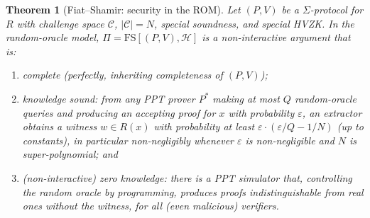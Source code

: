 \documentclass[11pt,a4paper]{article}
\newtheorem{theorem}{Theorem}[section]
\theoremstyle{definition}
\theoremstyle{remark}
\begin{document}
\begin{theorem}[Fiat--Shamir: security in the ROM]\label{zk:thm:fs}
Let \((P,V)\) be a \(\Sigma\)-protocol for \(R\) with challenge space \(\mathcal{C}\), \(|\mathcal{C}| = N\), special soundness, and special HVZK. In the random-oracle model, \(\Pi = \mathrm{FS}[(P,V), \mathcal{H}]\) is a non-interactive argument that is:
\begin{enumerate}
  \item \emph{complete} (perfectly, inheriting completeness of \((P,V)\));
  \item \emph{knowledge sound}: from any PPT prover \(P^*\) making at most \(Q\) random-oracle queries and producing an accepting proof for \(x\) with probability \(\varepsilon\), an extractor obtains a witness \(w\in R(x)\) with probability at least \(\varepsilon \cdot (\varepsilon/Q - 1/N)\) (up to constants), in particular non-negligibly whenever \(\varepsilon\) is non-negligible and \(N\) is super-polynomial; and
  \item \emph{(non-interactive) zero knowledge}: there is a PPT simulator that, controlling the random oracle by programming, produces proofs indistinguishable from real ones \emph{without} the witness, for all (even malicious) verifiers.
\end{enumerate}
\end{theorem}
\end{document}
